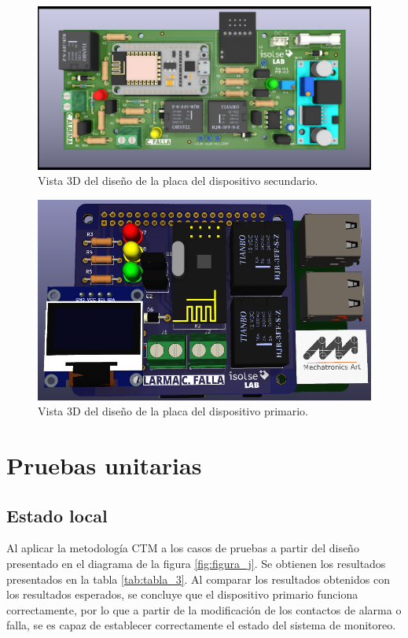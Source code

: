 \begin{figure}[h]
	\centering
	\includegraphics[scale=.25]{./Figures/Capitulo4/Figura_H.png}
	\caption{Vista 3D del diseño de la placa del dispositivo secundario.}
	\label{fig:figura_h}
\end{figure}

\begin{figure}[ht]
	\centering
	\includegraphics[scale=.3]{./Figures/Capitulo4/Figura_I.png}
	\caption{Vista 3D del diseño de la placa del dispositivo primario.}
	\label{fig:figura_i}
\end{figure}

\section{Pruebas unitarias}

\subsection{Estado local}

Al aplicar la metodología CTM a los casos de pruebas a partir del diseño presentado en el diagrama de la figura \ref{fig:figura_j}. Se obtienen los resultados presentados en la tabla \ref{tab:tabla_3}. Al comparar los resultados obtenidos con los resultados esperados, se concluye que el dispositivo primario funciona correctamente, por lo que a partir de la modificación de los contactos de alarma o falla, se es capaz de establecer correctamente el estado del sistema de monitoreo.


